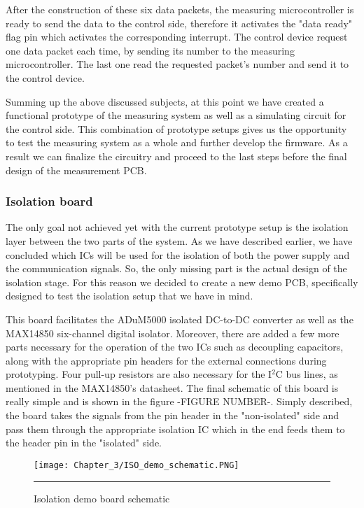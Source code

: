 After the construction of these six data packets, the measuring microcontroller is ready to send the data to the control side, therefore it activates the "data ready" flag pin which activates the corresponding interrupt. The control device request one data packet each time, by sending its number to the measuring microcontroller. The last one read the requested packet's number and send it to the control device.

Summing up the above discussed subjects, at this point we have created a functional prototype of the measuring system as well as a simulating circuit for the control side. This combination of prototype setups gives us the opportunity to test the measuring system as a whole and further develop the firmware. As a result we can finalize the circuitry and proceed to the last steps before the final design of the measurement PCB.

\subsubsection{Isolation board}
The only goal not achieved yet with the current prototype setup is the isolation layer between the two parts of the system. As we have described earlier, we have concluded which ICs will be used for the isolation of both the power supply and the communication signals. So, the only missing part is the actual design of the isolation stage. For this reason we decided to create a new demo PCB, specifically designed to test the isolation setup that we have in mind.

This board facilitates the ADuM5000 isolated DC-to-DC converter as well as the MAX14850 six-channel digital isolator. Moreover, there are added a few more parts necessary for the operation of the two ICs such as decoupling capacitors, along with the appropriate pin headers for the external connections during prototyping. Four pull-up resistors are also necessary for the I$^2$C bus lines, as mentioned in the MAX14850's datasheet. The final schematic of this board is really simple and is shown in the figure -FIGURE NUMBER-. Simply described, the board takes the signals from the pin header in the "non-isolated" side and pass them through the appropriate isolation IC which in the end feeds them to the header pin in the "isolated" side.\\


\begin{figure}[htbp]
	\centering
		\texttt{[image: Chapter\_3/ISO\_demo\_schematic.PNG]}
		\rule{35em}{0.5pt}
	\caption{Isolation demo board schematic}
	\label{fig:ISO_demo_schematic}
\end{figure}

